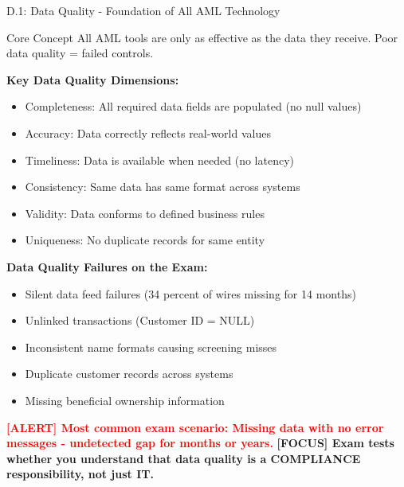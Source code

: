 \documentclass[11pt,a4paper]{beamer}
\newcommand{\redflag}[1]{\textcolor{red}{\textbf{[ALERT] #1}}}
\newcommand{\examfocus}[1]{\textcolor{orange!80!black}{\textbf{[FOCUS] #1}}}
\begin{document}
\begin{frame}{D.1: Data Quality - Foundation of All AML Technology}
	\begin{block}{Core Concept}
		All AML tools are only as effective as the data they receive. Poor data quality = failed controls.
	\end{block}
	\textbf{Key Data Quality Dimensions:}
	\begin{itemize}
		\item Completeness: All required data fields are populated (no null values)
		\item Accuracy: Data correctly reflects real-world values
		\item Timeliness: Data is available when needed (no latency)
		\item Consistency: Same data has same format across systems
		\item Validity: Data conforms to defined business rules
		\item Uniqueness: No duplicate records for same entity
	\end{itemize}
	\textbf{Data Quality Failures on the Exam:}
	\begin{itemize}
		\item Silent data feed failures (34 percent of wires missing for 14 months)
		\item Unlinked transactions (Customer ID = NULL)
		\item Inconsistent name formats causing screening misses
		\item Duplicate customer records across systems
		\item Missing beneficial ownership information
	\end{itemize}
	\redflag{Most common exam scenario: Missing data with no error messages - undetected gap for months or years.}
	\examfocus{Exam tests whether you understand that data quality is a COMPLIANCE responsibility, not just IT.}
\end{frame}
\end{document}
